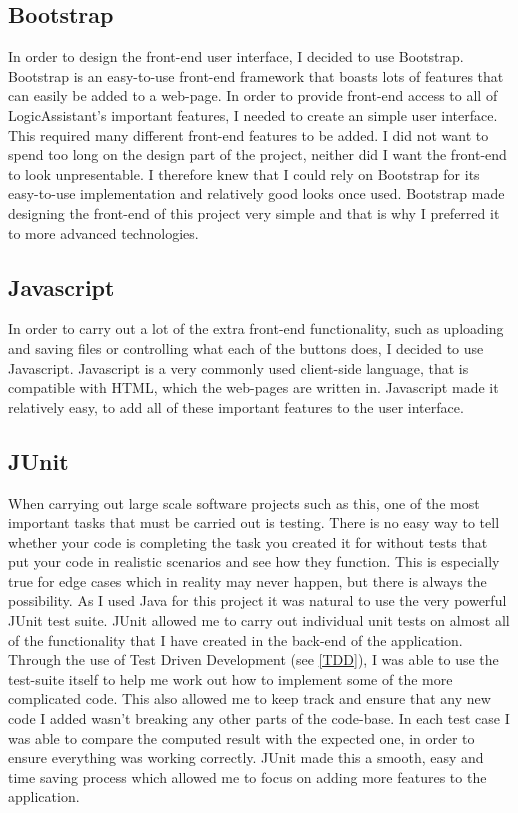 \subsection{Bootstrap \label{bootstrap}}
In order to design the front-end user interface, I decided to use Bootstrap. Bootstrap is an easy-to-use front-end framework that boasts lots of features that can easily be added to a web-page. In order to provide front-end access to all of LogicAssistant's important features, I needed to create an simple user interface. This required many different front-end features to be added. I did not want to spend too long on the design part of the project, neither did I want the front-end to look unpresentable. I therefore knew that I could rely on Bootstrap for its easy-to-use implementation and relatively good looks once used. Bootstrap made designing the front-end of this project very simple and that is why I preferred it to more advanced technologies.

\subsection{Javascript}

In order to carry out a lot of the extra front-end functionality, such as uploading and saving files or controlling what each of the buttons does, I decided to use Javascript. Javascript is a very commonly used client-side language, that is compatible with HTML, which the web-pages are written in. Javascript made it relatively easy, to add all of these important features to the user interface. 

\subsection{JUnit\label{JUnit}}

When carrying out large scale software projects such as this, one of the most important tasks that must be carried out is testing. There is no easy way to tell whether your code is completing the task you created it for without tests that put your code in realistic scenarios and see how they function. This is especially true for edge cases which in reality may never happen, but there is always the possibility. As I used Java for this project it was natural to use the very powerful JUnit test suite. JUnit allowed me to carry out individual unit tests on almost all of the functionality that I have created in the back-end of the application. Through the use of Test Driven Development (see \ref{TDD}), I was able to use the test-suite itself to help me work out how to implement some of the more complicated code. This also allowed me to keep track and ensure that any new code I added wasn't breaking any other parts of the code-base. In each test case I was able to compare the computed result with the expected one, in order to ensure everything was working correctly. JUnit made this a smooth, easy and time saving process which allowed me to focus on adding more features to the application.

